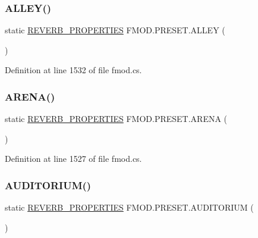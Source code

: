 \subsubsection{\texorpdfstring{A\+L\+L\+E\+Y()}{ALLEY()}}
{\footnotesize\ttfamily static \hyperlink{struct_f_m_o_d_1_1_r_e_v_e_r_b___p_r_o_p_e_r_t_i_e_s}{R\+E\+V\+E\+R\+B\+\_\+\+P\+R\+O\+P\+E\+R\+T\+I\+ES} F\+M\+O\+D.\+P\+R\+E\+S\+E\+T.\+A\+L\+L\+EY (\begin{DoxyParamCaption}{ }\end{DoxyParamCaption})\hspace{0.3cm}{\ttfamily [static]}}



Definition at line 1532 of file fmod.\+cs.

\mbox{\label{class_f_m_o_d_1_1_p_r_e_s_e_t_acde80a8345c707c7f3df71670c06716d}} 
\subsubsection{\texorpdfstring{A\+R\+E\+N\+A()}{ARENA()}}
{\footnotesize\ttfamily static \hyperlink{struct_f_m_o_d_1_1_r_e_v_e_r_b___p_r_o_p_e_r_t_i_e_s}{R\+E\+V\+E\+R\+B\+\_\+\+P\+R\+O\+P\+E\+R\+T\+I\+ES} F\+M\+O\+D.\+P\+R\+E\+S\+E\+T.\+A\+R\+E\+NA (\begin{DoxyParamCaption}{ }\end{DoxyParamCaption})\hspace{0.3cm}{\ttfamily [static]}}



Definition at line 1527 of file fmod.\+cs.

\mbox{\label{class_f_m_o_d_1_1_p_r_e_s_e_t_ae490944fdd4e2cc3baea2e82d425d6c7}} 
\subsubsection{\texorpdfstring{A\+U\+D\+I\+T\+O\+R\+I\+U\+M()}{AUDITORIUM()}}
{\footnotesize\ttfamily static \hyperlink{struct_f_m_o_d_1_1_r_e_v_e_r_b___p_r_o_p_e_r_t_i_e_s}{R\+E\+V\+E\+R\+B\+\_\+\+P\+R\+O\+P\+E\+R\+T\+I\+ES} F\+M\+O\+D.\+P\+R\+E\+S\+E\+T.\+A\+U\+D\+I\+T\+O\+R\+I\+UM (\begin{DoxyParamCaption}{ }\end{DoxyParamCaption})\hspace{0.3cm}{\ttfamily [static]}}




